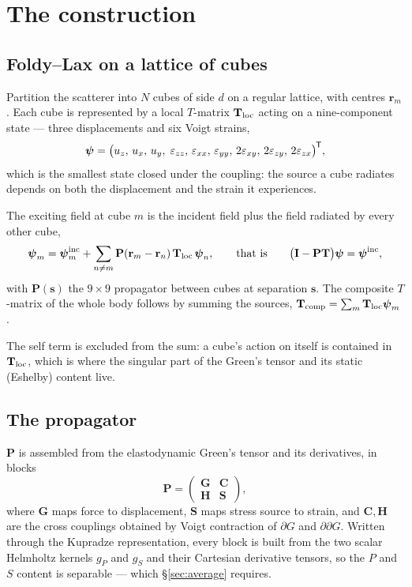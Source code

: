 \documentclass[11pt,a4paper]{article}
\newcommand{\bI}{\mathbf{I}}
\newcommand{\bP}{\mathbf{P}}
\newcommand{\bT}{\mathbf{T}}
\newcommand{\bG}{\mathbf{G}}
\newcommand{\bs}{\mathbf{s}}
\newcommand{\br}{\mathbf{r}}
\newcommand{\bpsi}{\boldsymbol{\psi}}
\newcommand{\tp}{^{\mkern-1.5mu\mathsf{T}}}
\begin{document}
\tableofcontents

\section{The construction}\label{sec:construction}

\subsection{Foldy--Lax on a lattice of cubes}

Partition the scatterer into $N$ cubes of side $d$ on a regular lattice, with
centres $\br_m$.  Each cube is represented by a local $T$-matrix $\bT_{\rm loc}$
acting on a nine-component state --- three displacements and six Voigt strains,
\begin{equation}
  \bpsi = \big(u_z,\,u_x,\,u_y,\;\varepsilon_{zz},\,\varepsilon_{xx},\,
               \varepsilon_{yy},\,2\varepsilon_{xy},\,2\varepsilon_{zy},\,
               2\varepsilon_{zx}\big)\tp,
\end{equation}
which is the smallest state closed under the coupling: the source a cube
radiates depends on both the displacement and the strain it experiences.

The exciting field at cube $m$ is the incident field plus the field radiated by
every other cube,
\begin{equation}\label{eq:foldy}
  \bpsi_m = \bpsi^{\rm inc}_m + \sum_{n\neq m} \bP(\br_m-\br_n)\,\bT_{\rm loc}\,\bpsi_n,
  \qquad\text{that is}\qquad
  \big(\bI - \bP\bT\big)\bpsi = \bpsi^{\rm inc},
\end{equation}
with $\bP(\bs)$ the $9\times9$ propagator between cubes at separation $\bs$.
The composite $T$-matrix of the whole body follows by summing the sources,
$\bT_{\rm comp} = \sum_m \bT_{\rm loc}\bpsi_m$.

The self term is excluded from the sum: a cube's action on itself is contained
in $\bT_{\rm loc}$, which is where the singular part of the Green's tensor and
its static (Eshelby) content live.

\subsection{The propagator}

$\bP$ is assembled from the elastodynamic Green's tensor and its derivatives,
in blocks
\begin{equation}\label{eq:Pblocks}
  \bP = \begin{pmatrix} \bG & \mathbf{C}\\[2pt] \mathbf{H} & \mathbf{S}\end{pmatrix},
\end{equation}
where $\bG$ maps force to displacement, $\mathbf{S}$ maps stress source to
strain, and $\mathbf{C},\mathbf{H}$ are the cross couplings obtained by Voigt
contraction of $\partial G$ and $\partial\partial G$.  Written through the
Kupradze representation, every block is built from the two scalar Helmholtz
kernels $g_P$ and $g_S$ and their Cartesian derivative tensors, so the $P$ and
$S$ content is separable --- which \S\ref{sec:average} requires.
\end{document}
